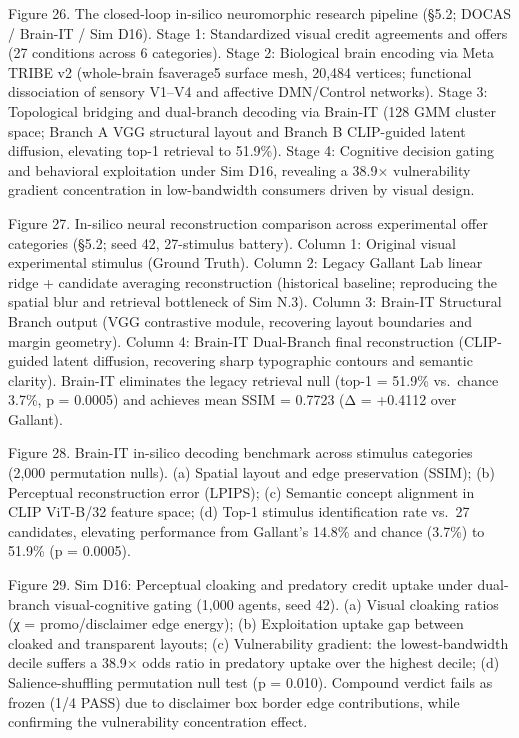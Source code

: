 \documentclass[
]{article}
\begin{document}
Figure 26. The closed-loop in-silico neuromorphic research pipeline
(§5.2; DOCAS / Brain-IT / Sim D16). Stage 1: Standardized visual credit
agreements and offers (27 conditions across 6 categories). Stage 2:
Biological brain encoding via Meta TRIBE v2 (whole-brain fsaverage5
surface mesh, 20,484 vertices; functional dissociation of sensory V1--V4
and affective DMN/Control networks). Stage 3: Topological bridging and
dual-branch decoding via Brain-IT (128 GMM cluster space; Branch A VGG
structural layout and Branch B CLIP-guided latent diffusion, elevating
top-1 retrieval to 51.9\%). Stage 4: Cognitive decision gating and
behavioral exploitation under Sim D16, revealing a {38.9×} vulnerability
gradient concentration in low-bandwidth consumers driven by visual
design.

Figure 27. In-silico neural reconstruction comparison across
experimental offer categories (§5.2; seed 42, 27-stimulus battery).
Column 1: Original visual experimental stimulus (Ground Truth). Column
2: Legacy Gallant Lab linear ridge + candidate averaging reconstruction
(historical baseline; reproducing the spatial blur and retrieval
bottleneck of Sim N.3). Column 3: Brain-IT Structural Branch output (VGG
contrastive module, recovering layout boundaries and margin geometry).
Column 4: Brain-IT Dual-Branch final reconstruction (CLIP-guided latent
diffusion, recovering sharp typographic contours and semantic clarity).
Brain-IT eliminates the legacy retrieval null ({top-1 = 51.9\%}
vs.~chance {3.7\%}, {p = 0.0005}) and achieves mean {SSIM = 0.7723}
({Δ = +0.4112} over Gallant).

Figure 28. Brain-IT in-silico decoding benchmark across stimulus
categories (2,000 permutation nulls). (a) Spatial layout and edge
preservation (SSIM); (b) Perceptual reconstruction error (LPIPS); (c)
Semantic concept alignment in CLIP ViT-B/32 feature space; (d) Top-1
stimulus identification rate vs.~27 candidates, elevating performance
from Gallant's 14.8\% and chance (3.7\%) to 51.9\% ({p = 0.0005}).

Figure 29. Sim D16: Perceptual cloaking and predatory credit uptake
under dual-branch visual-cognitive gating (1,000 agents, seed 42). (a)
Visual cloaking ratios ({χ} = promo/disclaimer edge energy); (b)
Exploitation uptake gap between cloaked and transparent layouts; (c)
Vulnerability gradient: the lowest-bandwidth decile suffers a {38.9×}
odds ratio in predatory uptake over the highest decile; (d)
Salience-shuffling permutation null test ({p = 0.010}). Compound verdict
fails as frozen (1/4 PASS) due to disclaimer box border edge
contributions, while confirming the vulnerability concentration effect.
\end{document}
